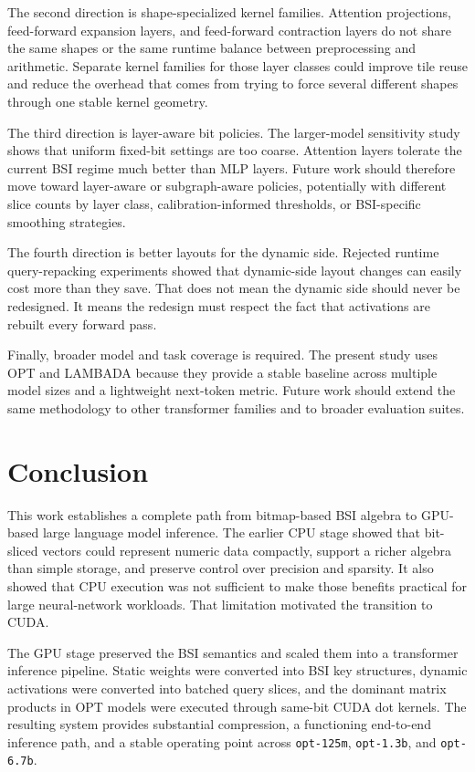 The second direction is shape-specialized kernel families. Attention projections, feed-forward expansion layers, and feed-forward contraction layers do not share the same shapes or the same runtime balance between preprocessing and arithmetic. Separate kernel families for those layer classes could improve tile reuse and reduce the overhead that comes from trying to force several different shapes through one stable kernel geometry.

The third direction is layer-aware bit policies. The larger-model sensitivity study shows that uniform fixed-bit settings are too coarse. Attention layers tolerate the current BSI regime much better than MLP layers. Future work should therefore move toward layer-aware or subgraph-aware policies, potentially with different slice counts by layer class, calibration-informed thresholds, or BSI-specific smoothing strategies.

The fourth direction is better layouts for the dynamic side. Rejected runtime query-repacking experiments showed that dynamic-side layout changes can easily cost more than they save. That does not mean the dynamic side should never be redesigned. It means the redesign must respect the fact that activations are rebuilt every forward pass.

Finally, broader model and task coverage is required. The present study uses OPT and LAMBADA because they provide a stable baseline across multiple model sizes and a lightweight next-token metric. Future work should extend the same methodology to other transformer families and to broader evaluation suites.

\section{Conclusion}\label{sec:conclusion}
This work establishes a complete path from bitmap-based BSI algebra to GPU-based large language model inference. The earlier CPU stage showed that bit-sliced vectors could represent numeric data compactly, support a richer algebra than simple storage, and preserve control over precision and sparsity. It also showed that CPU execution was not sufficient to make those benefits practical for large neural-network workloads. That limitation motivated the transition to CUDA.

The GPU stage preserved the BSI semantics and scaled them into a transformer inference pipeline. Static weights were converted into BSI key structures, dynamic activations were converted into batched query slices, and the dominant matrix products in OPT models were executed through same-bit CUDA dot kernels. The resulting system provides substantial compression, a functioning end-to-end inference path, and a stable operating point across \texttt{opt-125m}, \texttt{opt-1.3b}, and \texttt{opt-6.7b}.

